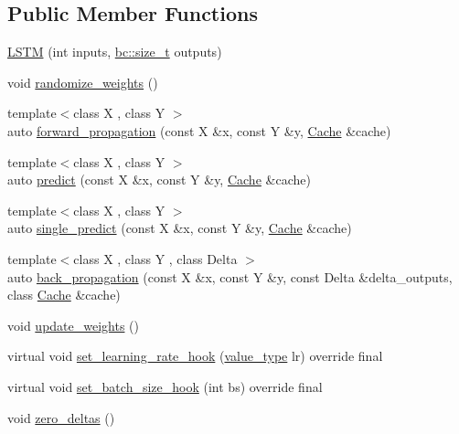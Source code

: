 \subsection*{Public Member Functions}
\begin{DoxyCompactItemize}
\item 
\hyperlink{structbc_1_1nn_1_1LSTM_acd8abe2e403ae4f8806b2a95d909a62a}{L\+S\+TM} (int inputs, \hyperlink{namespacebc_aaf8e3fbf99b04b1b57c4f80c6f55d3c5}{bc\+::size\+\_\+t} outputs)
\item 
void \hyperlink{structbc_1_1nn_1_1LSTM_a6364991b3bdf2d2364c90fdcd7a63c3a}{randomize\+\_\+weights} ()
\item 
{\footnotesize template$<$class X , class Y $>$ }\\auto \hyperlink{structbc_1_1nn_1_1LSTM_a1b3698141f27e32587a7c1ed367df095}{forward\+\_\+propagation} (const X \&x, const Y \&y, \hyperlink{structbc_1_1nn_1_1Cache}{Cache} \&cache)
\item 
{\footnotesize template$<$class X , class Y $>$ }\\auto \hyperlink{structbc_1_1nn_1_1LSTM_a5351e27bb23773b3daa2376ab525d207}{predict} (const X \&x, const Y \&y, \hyperlink{structbc_1_1nn_1_1Cache}{Cache} \&cache)
\item 
{\footnotesize template$<$class X , class Y $>$ }\\auto \hyperlink{structbc_1_1nn_1_1LSTM_a98237c18f037ecedd25581a11433a476}{single\+\_\+predict} (const X \&x, const Y \&y, \hyperlink{structbc_1_1nn_1_1Cache}{Cache} \&cache)
\item 
{\footnotesize template$<$class X , class Y , class Delta $>$ }\\auto \hyperlink{structbc_1_1nn_1_1LSTM_a15dc1ca2bf577ae2a22c01f1f81771e4}{back\+\_\+propagation} (const X \&x, const Y \&y, const Delta \&delta\+\_\+outputs, class \hyperlink{structbc_1_1nn_1_1Cache}{Cache} \&cache)
\item 
void \hyperlink{structbc_1_1nn_1_1LSTM_a5d295f0329b63593da595a6bbf159959}{update\+\_\+weights} ()
\item 
virtual void \hyperlink{structbc_1_1nn_1_1LSTM_a772315b1deeaa862a59437d4a1ccf9a8}{set\+\_\+learning\+\_\+rate\+\_\+hook} (\hyperlink{structbc_1_1nn_1_1LSTM_a4f4948a22b62ff7975968bb2d38e79a2}{value\+\_\+type} lr) override final
\item 
virtual void \hyperlink{structbc_1_1nn_1_1LSTM_af58d155c9bf27beb39b9898270515507}{set\+\_\+batch\+\_\+size\+\_\+hook} (int bs) override final
\item 
void \hyperlink{structbc_1_1nn_1_1LSTM_a415bda3dd81d13f4e675ad182ab6bc27}{zero\+\_\+deltas} ()

\end{DoxyCompactItemize}
